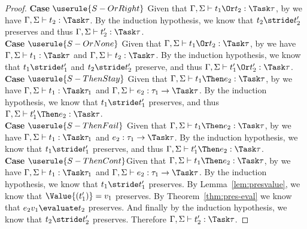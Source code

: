 \begin{proof}
  \noindent\textbf{Case} $\userule{S-OrRight}$ Given that
  $\Gamma,\Sigma\infers t_1\Or t_2:\Task\tau$, by  we have $\Gamma,\Sigma\infers t_2:\Task\tau$. By the induction hypothesis, we know that
  $t_2\stride t_2'$ preserves and thus $\Gamma,\Sigma\infers t_2':\Task\tau$.\\

  \noindent\textbf{Case} $\userule{S-OrNone}$ Given that
  $\Gamma,\Sigma\infers t_1\Or t_2:\Task\tau$, by  we have
  $\Gamma,\Sigma\infers t_1:\Task\tau$ and $\Gamma,\Sigma\infers t_2:\Task\tau$.
  By the induction hypothesis, we know that $t_1\stride t_1'$ and
  $t_2\stride t_2'$ preserve, and thus
  $\Gamma,\Sigma\infers t_1'\Or t_2':\Task\tau$.\\

  \noindent\textbf{Case} $\userule{S-ThenStay}$ Given that
  $\Gamma,\Sigma\infers t_1\Then e_2:\Task\tau$,
  by  we have $\Gamma,\Sigma\infers t_1:\Task\tau_1$ and
  $\Gamma,\Sigma\infers e_2:\tau_1\to\Task\tau$. By the induction
  hypothesis, we know that $t_1\stride t_1'$ preserves, and thus
  $\Gamma,\Sigma\infers t_1'\Then e_2:\Task\tau$.\\

  \noindent\textbf{Case} $\userule{S-ThenFail}$ Given that
  $\Gamma,\Sigma\infers t_1\Then e_2:\Task\tau$,
  by  we have $\Gamma,\Sigma\infers t_1:\Task\tau_1$ and
  $e_2:\tau_1\to\Task\tau$. By the induction
  hypothesis, we know that $t_1\stride t_1'$ preserves, and thus
  $\Gamma,\Sigma\infers t_1'\Then e_2:\Task\tau$.\\

  \noindent\textbf{Case} $\userule{S-ThenCont}$Given that
  $\Gamma,\Sigma\infers t_1\Then e_2:\Task\tau$, by  we have
  $\Gamma,\Sigma\infers t_1:\Task\tau_1$ and
  $\Gamma,\Sigma\infers e_2:\tau_1\to\Task\tau$. By the induction hypothesis, we
  know that $t_1\stride t_1'$ preserves. By Lemma~\ref{lem:presvalue}, we know
  that $\Value{(t_1')}=v_1$ preserves. By Theorem~\ref{thm:pres-eval} we know
  that $e_2 v_1\evaluate t_2$ preserves. And finally by the induction hypothesis,
  we know that $t_2\stride t_2'$ preserves. Therefore
  $\Gamma,\Sigma\infers t_2':\Task\tau$.

\end{proof}

